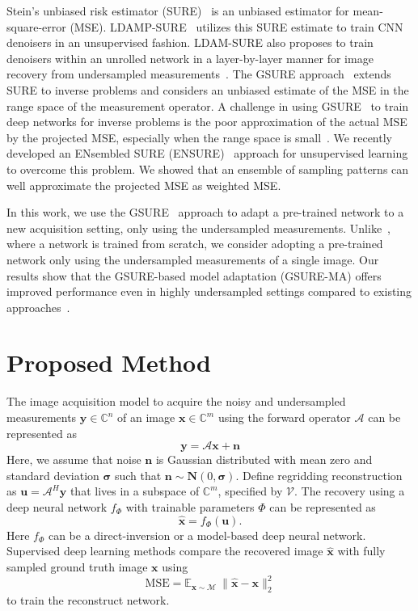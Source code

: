 \documentclass{article}
\newcommand{\bs}{\boldsymbol}
\newcommand{\mbf}{\mathbf}
\begin{document}
Stein's unbiased risk estimator (SURE)~\cite{sure} is an unbiased estimator for mean-square-error (MSE). LDAMP-SURE~\cite{metzler2018} utilizes this SURE estimate to train CNN denoisers in an unsupervised fashion. LDAM-SURE also proposes to train denoisers within an unrolled network in a layer-by-layer manner for image recovery from undersampled measurements~\cite{metzler2018}. The GSURE approach~\cite{eldarGSURE} extends SURE to inverse problems and considers an unbiased estimate of the MSE in the range space of the measurement operator. A challenge in using GSURE~\cite{eldarGSURE} to train deep networks for inverse problems is the poor approximation of the actual MSE by the projected MSE, especially when the range space is small~\cite{metzler2018}. We recently developed an ENsembled SURE (ENSURE)~\cite{ensure} approach for unsupervised learning to overcome this problem. We showed that an ensemble of sampling patterns can well approximate the projected MSE as weighted MSE.

In this work, we use the GSURE~\cite{eldarGSURE} approach to adapt a pre-trained network to a new acquisition setting, only using the undersampled measurements. Unlike~\cite{ensure}, where a network is trained from scratch,  we consider adopting a pre-trained network only using the undersampled measurements of a single image. Our results show that the GSURE-based model adaptation (GSURE-MA) offers improved performance even in highly undersampled settings compared to existing approaches~\cite{ssduft, dip2018}.


\section{Proposed Method}
The image acquisition model to acquire the noisy and undersampled measurements $\bs y \in \mathbb C^n$ of an image $\bs x \in \mathbb C^m$ using the forward operator $\mathcal A$ can be represented as
\begin{equation}
	\label{eq:fwd}
	\bs y=\mathcal A \bs x +\bs n
\end{equation}
Here, we assume that noise $\bs n$ is Gaussian distributed with mean zero and standard deviation $\mbf \sigma$ such that $\bs{n}\sim \bs N(0,\mbf \sigma)$. Define regridding reconstruction as {$\bs u=\mathcal A^H \bs y$} that lives in a subspace of $\mathbb C^m$, specified by $\mathcal V$.  The recovery using a deep neural network $f_\Phi$ with trainable parameters $\Phi$ can be represented as
\begin{equation}
	\label{recon}
	\bs{\widehat x} = f_{\Phi}(\bs {u}). 
\end{equation}
Here $f_\Phi$ can be a direct-inversion or a model-based deep neural network. Supervised deep learning methods compare the recovered image $\widehat{\bs x}$ with fully sampled ground truth image $\bs x$ using 
\begin{equation}
	\label{eq:mse}
	\text{MSE}= \mathbb E_{\bs x \sim \mathcal M}~ \| \bs{\widehat x} -  \bs x \|_2^2
\end{equation}
 to train the reconstruct network.
\end{document}
